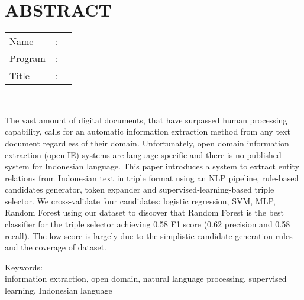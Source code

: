 %
%
%

\chapter*{ABSTRACT}

\vspace*{0.2cm}

\noindent \begin{tabular}{l l p{11.0cm}}
	Name&: & \penulis \\
	Program&: & \program \\
	Title&: & \judulInggris \\
\end{tabular} \\ 

\vspace*{0.5cm}

\noindent The vast amount of digital documents, that have surpassed human processing capability, calls for an automatic information extraction method from any text document regardless of their domain. Unfortunately, open domain information extraction (open IE) systems are language-specific and there is no published system for Indonesian language. This paper introduces a system to extract entity relations from Indonesian text in triple format using an NLP pipeline, rule-based candidates generator, token expander and supervised-learning-based triple selector. We cross-validate four candidates: logistic regression, SVM, MLP, Random Forest using our dataset to discover that Random Forest is the best classifier for the triple selector achieving 0.58 F1 score (0.62 precision and 0.58 recall). The low score is largely due to the simplistic candidate generation rules and the coverage of dataset.\\

\vspace*{0.2cm}

\noindent Keywords: \\ 
\noindent information extraction, open domain, natural language processing, supervised learning, Indonesian language

\newpage